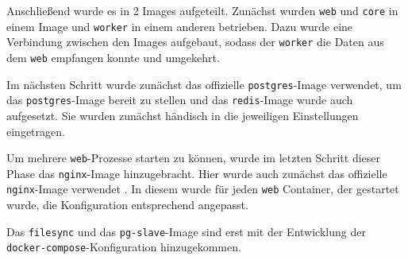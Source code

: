 \documentclass[11pt,a4paper]{article}
\begin{document}
Anschließend wurde es in 2 Images aufgeteilt. Zunächst wurden \texttt{web} und 
\texttt{core} in einem Image und \texttt{worker} in einem anderen betrieben. 
Dazu wurde eine Verbindung zwischen den Images aufgebaut, sodass der 
\texttt{worker} die Daten aus dem \texttt{web} empfangen konnte und umgekehrt.

Im nächsten Schritt wurde zunächst das offizielle \texttt{postgres}-Image 
\cite{pgoffdock} verwendet, um das \texttt{postgres}-Image bereit zu stellen und das \texttt{redis}-Image wurde auch aufgesetzt. Sie wurden zunächst händisch in die jeweiligen Einstellungen eingetragen.

Um mehrere \texttt{web}-Prozesse starten zu können, wurde im letzten Schritt 
dieser Phase das \texttt{nginx}-Image hinzugebracht. Hier wurde auch zunächst 
das offizielle \texttt{nginx}-Image verwendet \cite{nginxdock}. In diesem wurde 
für jeden \texttt{web} Container, der gestartet wurde, die Konfiguration 
entsprechend angepasst.

Das \texttt{filesync} und das \texttt{pg-slave}-Image sind erst mit der 
Entwicklung der \texttt{docker-compose}-Konfiguration hinzugekommen.
\clearpage
\end{document}
